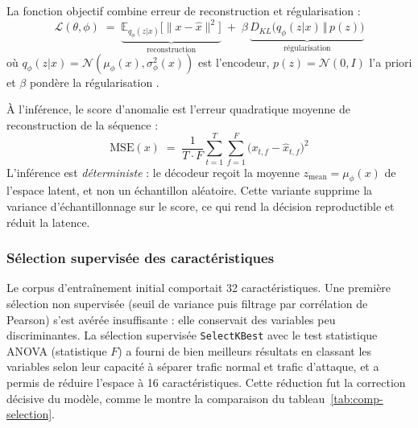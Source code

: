 La fonction objectif combine erreur de reconstruction et régularisation :
\begin{equation}
\mathcal{L}(\theta,\phi) \;=\; \underbrace{\mathbb{E}_{q_\phi(z|x)}\big[\lVert x-\hat{x}\rVert^2\big]}_{\text{reconstruction}} \;+\; \beta\,\underbrace{D_{KL}\big(q_\phi(z|x)\,\Vert\,p(z)\big)}_{\text{régularisation}}
\label{eq:elbo}
\end{equation}
où $q_\phi(z|x)=\mathcal{N}(\mu_\phi(x),\sigma^2_\phi(x))$ est l'encodeur, $p(z)=\mathcal{N}(0,I)$ l'a priori et $\beta$ pondère la régularisation .

À l'inférence, le score d'anomalie est l'erreur quadratique moyenne de reconstruction de la séquence :
\begin{equation}
\mathrm{MSE}(x) \;=\; \frac{1}{T\cdot F}\sum_{t=1}^{T}\sum_{f=1}^{F}\big(x_{t,f}-\hat{x}_{t,f}\big)^2
\label{eq:mse}
\end{equation}
L'inférence est \emph{déterministe} : le décodeur reçoit la moyenne $z_{\text{mean}}=\mu_\phi(x)$ de l'espace latent, et non un échantillon aléatoire. Cette variante supprime la variance d'échantillonnage sur le score, ce qui rend la décision reproductible et réduit la latence.


\subsubsection{Sélection supervisée des caractéristiques}
\label{sec:selection-features}

Le corpus d'entraînement initial comportait 32 caractéristiques. Une première sélection non supervisée (seuil de variance puis filtrage par corrélation de Pearson) s'est avérée insuffisante : elle conservait des variables peu discriminantes. La sélection supervisée \texttt{SelectKBest} avec le test statistique ANOVA (statistique $F$) a fourni de bien meilleurs résultats en classant les variables selon leur capacité à séparer trafic normal et trafic d'attaque, et a permis de réduire l'espace à 16 caractéristiques. Cette réduction fut la correction décisive du modèle, comme le montre la comparaison du tableau~\ref{tab:comp-selection}.

